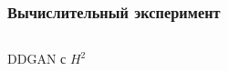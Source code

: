 \documentclass[8pt]{beamer}
\begin{document}
\begin{frame}
	\frametitle{Вычислительный эксперимент}
	\begin{columns}
		\begin{column}{0.8\textwidth}
			\begin{block}{DDGAN с $H^2$}
				\begin{figure}[H]
				\end{figure}
			\end{block}
		\end{column}
		\begin{column}{0.23\textwidth}
			\begin{figure}[H]
				

\end{figure}
\end{column}
\end{columns}
\end{frame}
\end{document}
